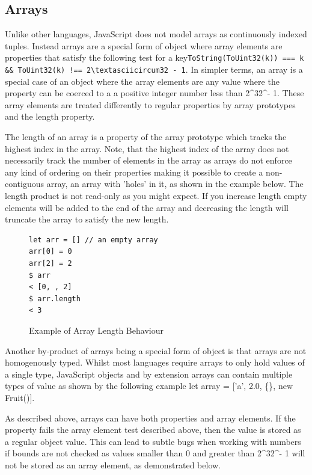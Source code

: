 \documentclass[]{final_report}
\begin{document}
\subsection{Arrays}
Unlike other languages, JavaScript does not model arrays as continuously indexed tuples. Instead arrays are  a special form of object where array elements are properties that satisfy the following test for a key\lstinline{ToString(ToUint32(k)) === k && ToUint32(k) !== 2\textasciicircum32 - 1}. In simpler terms, an array is a special case of an object where the array elements are any value where the property can be coerced to a a positive integer number less than 2\textasciicircum32\textasciicircum - 1. These array elements are treated differently to regular properties by array prototypes and the length property. 

The length of an array is a property of the array prototype which tracks the highest index in the array. Note, that the highest index of the array does not necessarily track the number of elements in the array as arrays do not enforce any kind of ordering on their properties making it possible to create a non-contiguous array, an array with 'holes' in it, as shown in the example below. The length product is not read-only as you might expect. If you increase length empty elements will be added to the end of the array and decreasing the length will truncate the array to satisfy the new length.

\begin{figure}[h]
\begin{verbatim}
let arr = [] // an empty array
arr[0] = 0
arr[2] = 2
$ arr
< [0, , 2]
$ arr.length 
< 3
\end{verbatim}
\caption{\label{fig:js-array-length} Example of Array Length Behaviour}
\end{figure}

Another by-product of arrays being a special form of object is that arrays are not homogenously typed. Whilst most languages require arrays to only hold values of a single type, JavaScript objects and by extension arrays can contain multiple types of value as shown by the following example let array = ['a', 2.0, \{\}, new Fruit()]. 

As described above, arrays can have both properties and array elements. If the property fails the array element test described above, then the value is stored as a regular object value. This can lead to subtle bugs when working with numbers if bounds are not checked as values smaller than 0 and greater than 2\textasciicircum32\textasciicircum - 1 will not be stored as an array element, as demonstrated below.
\end{document}
